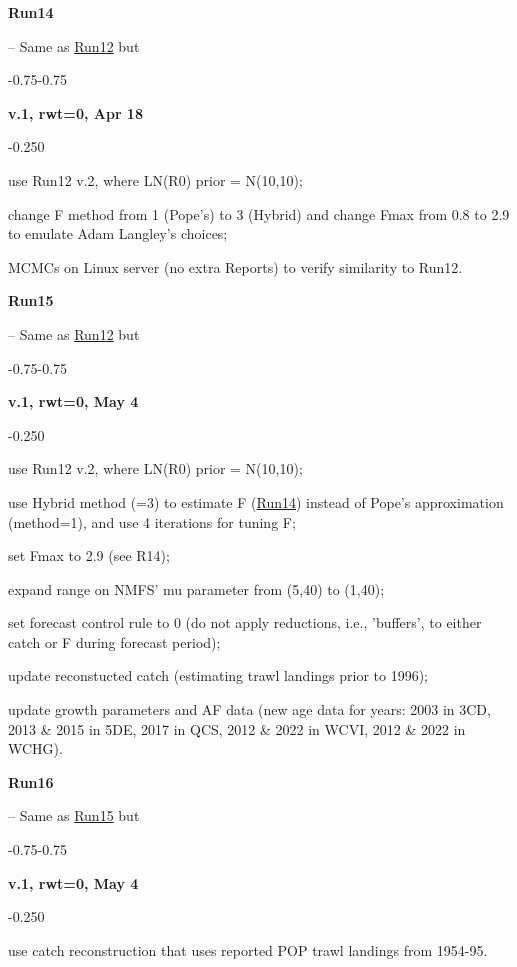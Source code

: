 \hypertarget{R14}{\textbf{Run14}} -- Same as \hyperlink{R12}{Run12} but
\begin{itemize_csas}{-0.75}{-0.75}
	\item \textbf{v.1, rwt=0, Apr 18}
	\begin{itemize_csas}{-0.25}{0}
		\item use Run12 v.2, where LN(R0) prior = N(10,10);
		\item change F method from 1 (Pope's) to 3 (Hybrid) and change Fmax from 0.8 to 2.9 to emulate Adam Langley's choices;
		\item MCMCs on Linux server (no extra Reports) to verify similarity to Run12.
	\end{itemize_csas}
\end{itemize_csas}

\hypertarget{R15}{\textbf{Run15}} -- Same as \hyperlink{R12}{Run12} but
\begin{itemize_csas}{-0.75}{-0.75}
	\item \textbf{v.1, rwt=0, May 4}
	\begin{itemize_csas}{-0.25}{0}
		\item use Run12 v.2, where LN(R0) prior = N(10,10);
		\item use Hybrid method (=3) to estimate F (\hyperlink{R14}{Run14}) instead of Pope's approximation (method=1), and use 4 iterations for tuning F;
		\item set Fmax to 2.9 (see R14);
		\item expand range on NMFS' mu parameter from (5,40) to (1,40);
		\item set forecast control rule to 0 (do not apply reductions, i.e., 'buffers', to either catch or F during forecast period);
		\item update reconstucted catch (estimating trawl landings prior to 1996);
		\item update growth parameters and AF data (new age data for years: 2003 in 3CD, 2013 \& 2015 in 5DE, 2017 in QCS, 2012 \& 2022 in WCVI, 2012 \& 2022 in WCHG).
	\end{itemize_csas}
\end{itemize_csas}

\hypertarget{R16}{\textbf{Run16}} -- Same as \hyperlink{R15}{Run15} but
\begin{itemize_csas}{-0.75}{-0.75}
	\item \textbf{v.1, rwt=0, May 4}
	\begin{itemize_csas}{-0.25}{0}
		\item use catch reconstruction that uses reported POP trawl landings from 1954-95.
	\end{itemize_csas}
\end{itemize_csas}

